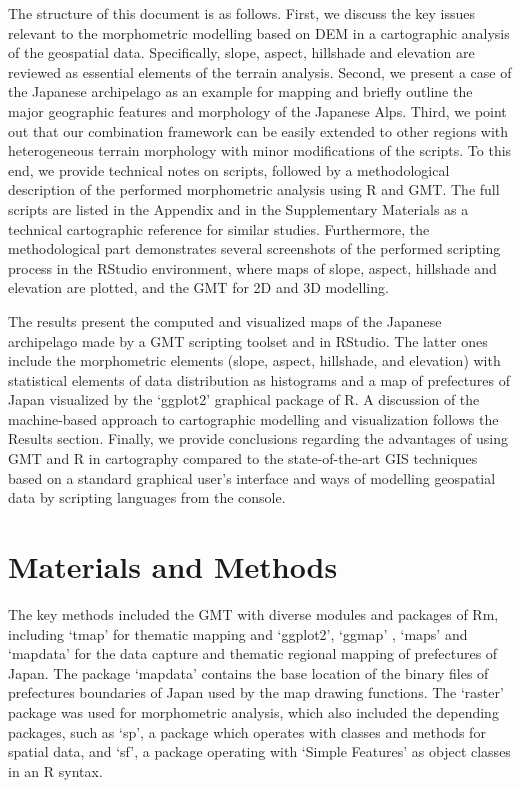 \documentclass[land,article,accept,pdftex,moreauthors]{Definitions/mdpi}
\begin{document}
The structure of this document is as follows. First, we discuss the key issues relevant to the morphometric modelling based on DEM in a cartographic analysis of the geospatial data. Specifically, slope, aspect, hillshade and elevation are reviewed as essential elements of the terrain analysis. Second, we present a case of the Japanese archipelago as an example for mapping and briefly outline the major geographic features and morphology of the Japanese Alps. Third, we point out that our combination framework can be easily extended to other regions with heterogeneous terrain morphology with minor modifications of the scripts. To this end, we provide technical notes on scripts, followed by a methodological description of the performed morphometric analysis using R and GMT. The full scripts are listed in the Appendix and in the Supplementary Materials as a technical cartographic reference for similar studies. Furthermore, the methodological part demonstrates several screenshots of the performed scripting process in the RStudio environment, where maps of slope, aspect, hillshade and elevation are plotted, and the GMT for 2D and 3D modelling. 

The results present the computed and visualized maps of the Japanese archipelago made by a GMT scripting toolset and in RStudio. The latter ones include the morphometric elements (slope, aspect, hillshade, and elevation) with statistical elements of data distribution as histograms and a map of prefectures of Japan visualized by the ‘ggplot2’ graphical package of R. A discussion of the machine-based approach to cartographic modelling and visualization follows the Results section. Finally, we provide conclusions regarding the advantages of using GMT and R in cartography compared to the state-of-the-art GIS techniques based on a standard graphical user's interface and ways of modelling geospatial data by scripting languages from the console. 

\section{Materials and Methods}
The key methods included the GMT with diverse modules and packages of Rm, including ‘tmap’ for thematic mapping and ‘ggplot2’, ‘ggmap’ \cite{KahleWickham}, ‘maps’ and ‘mapdata’ for the data capture and thematic regional mapping of prefectures of Japan. The package ‘mapdata’ contains the base location of the binary files of prefectures boundaries of Japan used by the map drawing functions. The ‘raster’ package was used for morphometric analysis, which also included the depending packages, such as ‘sp’, a package which operates with classes and methods for spatial data, and ‘sf’, a package operating with ‘Simple Features’ as object classes in an R syntax. 
\end{document}
